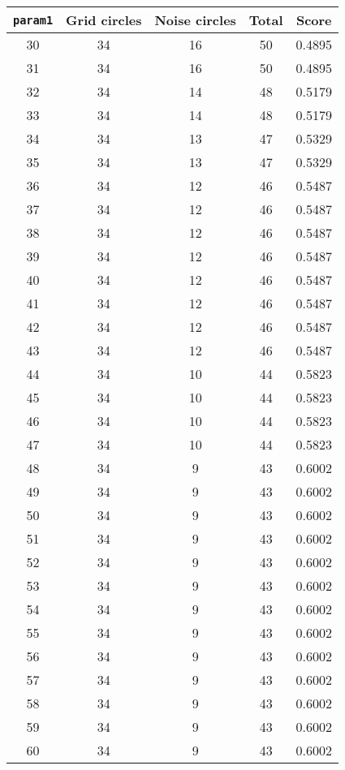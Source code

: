 \documentclass[letterpaper, 12pt]{article}
\begin{document}
\begin{longtable}{|c|c|c|c|c|}
\hline
\textbf{\texttt{param1}} & \textbf{Grid circles} & \textbf{Noise circles} & \textbf{Total} & \textbf{Score} \\
\hline
30 & 34 & 16 & 50 & 0.4895 \\
\hline
31 & 34 & 16 & 50 & 0.4895 \\
\hline
32 & 34 & 14 & 48 & 0.5179 \\
\hline
33 & 34 & 14 & 48 & 0.5179 \\
\hline
34 & 34 & 13 & 47 & 0.5329 \\
\hline
35 & 34 & 13 & 47 & 0.5329 \\
\hline
36 & 34 & 12 & 46 & 0.5487 \\
\hline
37 & 34 & 12 & 46 & 0.5487 \\
\hline
38 & 34 & 12 & 46 & 0.5487 \\
\hline
39 & 34 & 12 & 46 & 0.5487 \\
\hline
40 & 34 & 12 & 46 & 0.5487 \\
\hline
41 & 34 & 12 & 46 & 0.5487 \\
\hline
42 & 34 & 12 & 46 & 0.5487 \\
\hline
43 & 34 & 12 & 46 & 0.5487 \\
\hline
44 & 34 & 10 & 44 & 0.5823 \\
\hline
45 & 34 & 10 & 44 & 0.5823 \\
\hline
46 & 34 & 10 & 44 & 0.5823 \\
\hline
47 & 34 & 10 & 44 & 0.5823 \\
\hline
48 & 34 & 9 & 43 & 0.6002 \\
\hline
49 & 34 & 9 & 43 & 0.6002 \\
\hline
50 & 34 & 9 & 43 & 0.6002 \\
\hline
51 & 34 & 9 & 43 & 0.6002 \\
\hline
52 & 34 & 9 & 43 & 0.6002 \\
\hline
53 & 34 & 9 & 43 & 0.6002 \\
\hline
54 & 34 & 9 & 43 & 0.6002 \\
\hline
55 & 34 & 9 & 43 & 0.6002 \\
\hline
56 & 34 & 9 & 43 & 0.6002 \\
\hline
57 & 34 & 9 & 43 & 0.6002 \\
\hline
58 & 34 & 9 & 43 & 0.6002 \\
\hline
59 & 34 & 9 & 43 & 0.6002 \\
\hline
60 & 34 & 9 & 43 & 0.6002 \\

\end{longtable}
\end{document}
